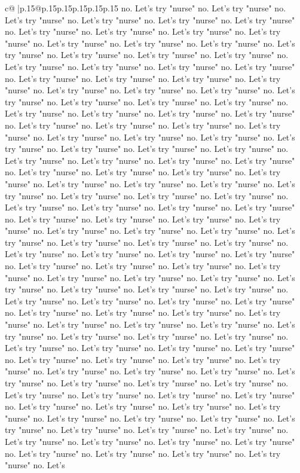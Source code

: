 \documentclass{article}
\begin{document}
{\begin{supertabular}{c@{$\;$}|p{.15\linewidth}@{}p{.15\linewidth}p{.15\linewidth}p{.15\linewidth}p{.15\linewidth}p{.15\linewidth}}
{{{no. Let's try "nurse" no. Let's try "nurse" no. Let's try "nurse" no. Let's try "nurse" no. Let's try "nurse" no. Let's try "nurse" no. Let's try "nurse" no. Let's try "nurse" no. Let's try "nurse" no. Let's try "nurse" no. Let's try "nurse" no. Let's try "nurse" no. Let's try "nurse" no. Let's try "nurse" no. Let's try "nurse" no. Let's try "nurse" no. Let's try "nurse" no. Let's try "nurse" no. Let's try "nurse" no. Let's try "nurse" no. Let's try "nurse" no. Let's try "nurse" no. Let's try "nurse" no. Let's try "nurse" no. Let's try "nurse" no. Let's try "nurse" no. Let's try "nurse" no. Let's try "nurse" no. Let's try "nurse" no. Let's try "nurse" no. Let's try "nurse" no. Let's try "nurse" no. Let's try "nurse" no. Let's try "nurse" no. Let's try "nurse" no. Let's try "nurse" no. Let's try "nurse" no. Let's try "nurse" no. Let's try "nurse" no. Let's try "nurse" no. Let's try "nurse" no. Let's try "nurse" no. Let's try "nurse" no. Let's try "nurse" no. Let's try "nurse" no. Let's try "nurse" no. Let's try "nurse" no. Let's try "nurse" no. Let's try "nurse" no. Let's try "nurse" no. Let's try "nurse" no. Let's try "nurse" no. Let's try "nurse" no. Let's try "nurse" no. Let's try "nurse" no. Let's try "nurse" no. Let's try "nurse" no. Let's try "nurse" no. Let's try "nurse" no. Let's try "nurse" no. Let's try "nurse" no. Let's try "nurse" no. Let's try "nurse" no. Let's try "nurse" no. Let's try "nurse" no. Let's try "nurse" no. Let's try "nurse" no. Let's try "nurse" no. Let's try "nurse" no. Let's try "nurse" no. Let's try "nurse" no. Let's try "nurse" no. Let's try "nurse" no. Let's try "nurse" no. Let's try "nurse" no. Let's try "nurse" no. Let's try "nurse" no. Let's try "nurse" no. Let's try "nurse" no. Let's try "nurse" no. Let's try "nurse" no. Let's try "nurse" no. Let's try "nurse" no. Let's try "nurse" no. Let's try "nurse" no. Let's try "nurse" no. Let's try "nurse" no. Let's try "nurse" no. Let's try "nurse" no. Let's try "nurse" no. Let's try "nurse" no. Let's try "nurse" no. Let's try "nurse" no. Let's try "nurse" no. Let's try "nurse" no. Let's try "nurse" no. Let's try "nurse" no. Let's try "nurse" no. Let's try "nurse" no. Let's try "nurse" no. Let's try "nurse" no. Let's try "nurse" no. Let's try "nurse" no. Let's try "nurse" no. Let's try "nurse" no. Let's try "nurse" no. Let's try "nurse" no. Let's try "nurse" no. Let's try "nurse" no. Let's try "nurse" no. Let's try "nurse" no. Let's try "nurse" no. Let's try "nurse" no. Let's try "nurse" no. Let's try "nurse" no. Let's try "nurse" no. Let's try "nurse" no. Let's try "nurse" no. Let's try "nurse" no. Let's try "nurse" no. Let's try "nurse" no. Let's try "nurse" no. Let's try "nurse" no. Let's try "nurse" no. Let's try "nurse" no. Let's try "nurse" no. Let's try "nurse" no. Let's try "nurse" no. Let's try "nurse" no. Let's try "nurse" no. Let's try "nurse" no. Let's try "nurse" no. Let's try "nurse" no. Let's try "nurse" no. Let's try "nurse" no. Let's try "nurse" no. Let's try "nurse" no. Let's try "nurse" no. Let's try "nurse" no. Let's try "nurse" no. Let's try "nurse" no. Let's try "nurse" no. Let's try "nurse" no. Let's try "nurse" no. Let's try "nurse" no. Let's }}}
\end{supertabular}}
\end{document}
